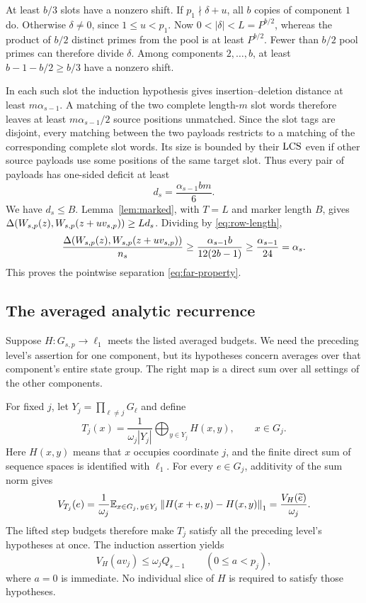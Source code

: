 At least $b/3$ slots have a nonzero shift. If $p_1\nmid\delta+u$, all $b$
copies of component $1$ do. Otherwise $\delta\ne0$, since $1\le u<p_1$.
Now $0<|\delta|<L=P^{b/2}$, whereas the product of $b/2$ distinct primes
from the pool is at least $P^{b/2}$. Fewer than $b/2$ pool primes can
therefore divide $\delta$. Among components $2,\ldots,b$, at least
$b-1-b/2\ge b/3$ have a nonzero shift.

In each such slot the induction hypothesis gives
insertion--deletion distance at least $m\alpha_{s-1}$. A matching of
the two complete length-$m$ slot words therefore leaves at least
$m\alpha_{s-1}/2$ source positions unmatched. Since the slot tags are
disjoint, every matching between the two payloads restricts to a
matching of the corresponding complete slot words. Its size is bounded
by their $\operatorname{LCS}$ even if other source payloads use some positions of the
same target slot. Thus every pair of payloads has one-sided deficit at
least
\[
 d_s=\frac{\alpha_{s-1}bm}{6}.
\]
We have $d_s\le B$. Lemma~\ref{lem:marked}, with $T=L$ and marker
length $B$, gives
$\Delta(W_{s,p}(z),W_{s,p}(z+uv_{s,p}))\ge Ld_s$. Dividing by
\eqref{eq:row-length},
\[
 \frac{\Delta(W_{s,p}(z),W_{s,p}(z+uv_{s,p}))}{n_s}
 \ge\frac{\alpha_{s-1}b}{12(2b-1)}
 \ge\frac{\alpha_{s-1}}{24}=\alpha_s.
\]
This proves the pointwise separation \eqref{eq:far-property}.

\subsection{The averaged analytic recurrence}\label{sec:averaged}

Suppose $H:G_{s,p}\to\ell_1$ meets the listed averaged budgets.
We need the preceding level's assertion for one component, but its
hypotheses concern averages over that component's entire state group.
The right map is a direct sum over all settings of the other components.

For fixed $j$, let $Y_j=\prod_{\ell\ne j}G_\ell$ and define
\begin{equation}\label{eq:slice-map}
 T_j(x)=\frac1{\omega_j|Y_j|}
          \bigoplus_{y\in Y_j}H(x,y),\qquad x\in G_j.
\end{equation}
Here $H(x,y)$ means that $x$ occupies coordinate $j$, and the finite
direct sum of sequence spaces is identified with $\ell_1$. For every
$e\in G_j$, additivity of the sum norm gives
\begin{equation}\label{eq:slice-identity}
 V_{T_j}(e)
 =\frac1{\omega_j}\mathbb E_{x\in G_j,\,y\in Y_j}
       \left\lVert H(x+e,y)-H(x,y)\right\rVert_1
 =\frac{V_H(\widetilde e)}{\omega_j}.
\end{equation}
The lifted step budgets therefore make $T_j$ satisfy all the
preceding level's hypotheses at once. The induction assertion yields
\begin{equation}\label{eq:component-control}
 V_H(av_j)\le\omega_jQ_{s-1}\qquad(0\le a<p_j),
\end{equation}
where $a=0$ is immediate. No individual slice of $H$ is required to
satisfy those hypotheses.

